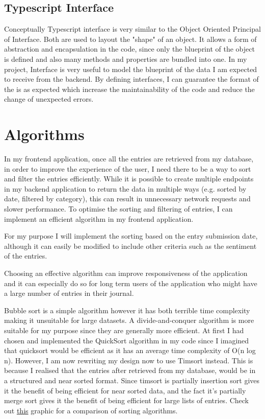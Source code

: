 \subsection{Typescript Interface}
Conceptually Typescript interface is very similar to the Object Oriented Principal of Interface. Both are used to layout the "shape" of an object. It allows a form of abstraction and encapsulation in the code, since only the blueprint of the object is defined and also many methods and properties are bundled into one. In my project, Interface is very useful to model the blueprint of the data I am expected to receive from the backend. By defining interfaces, I can guarantee the format of the is as expected which increase the maintainability of the code and reduce the change of unexpected errors.


\section{Algorithms}
In my frontend application, once all the entries are retrieved from my database, in order to improve the experience of the user, I need there to be a way to sort and filter the entries efficiently. While it is possible to create multiple endpoints in my backend application to return the data in multiple ways (e.g. sorted by date, filtered by category), this can result in unnecessary network requests and slower performance. To optimise the sorting and filtering of entries, I can implement an efficient algorithm in my frontend application.

For my purpose I will implement the sorting based on the entry submission date, although it can easily be modified to include other criteria such as the sentiment of the entries.

Choosing an effective algorithm can improve responsiveness of the application and it can especially do so for long term users of the application who might have a large number of entries in their journal.

Bubble sort is a simple algorithm however it has both terrible time complexity making it unsuitable for large datasets. A divide-and-conquer algorithm is more suitable for my purpose since they are generally more efficient. At first I had chosen and implemented the QuickSort algorithm in my code since I imagined that quicksort would be efficient as it has an average time complexity of O(n log n). However, I am now rewriting my design now to use Timsort instead. This is because I realised that the entries after retrieved from my database, would be in a structured and near sorted format. Since timsort is partially insertion sort gives it the benefit of being efficient for near sorted data, and the fact it's partially merge sort gives it the benefit of being efficient for large lists of entries. Check out \href{https://www.toptal.com/developers/sorting-algorithms}{this} graphic for a comparison of sorting algorithms.

